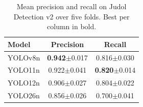\begin{table}[t]
\caption{Mean precision and recall on Judol Detection v2 over five folds. Best per column in bold.}
\label{tab:pr}
\centering\footnotesize\renewcommand{\arraystretch}{1.3}
\begin{tabular}{@{}lcc@{}}
\toprule
\textbf{Model} & \textbf{Precision} & \textbf{Recall} \\
\midrule
YOLOv8n & \textbf{0.942}$\pm$0.017 & 0.816$\pm$0.030 \\
YOLO11n & 0.922$\pm$0.041 & \textbf{0.820}$\pm$0.014 \\
YOLO12n & 0.906$\pm$0.027 & 0.804$\pm$0.022 \\
YOLO26n & 0.856$\pm$0.026 & 0.700$\pm$0.041 \\
\bottomrule
\end{tabular}
\end{table}
